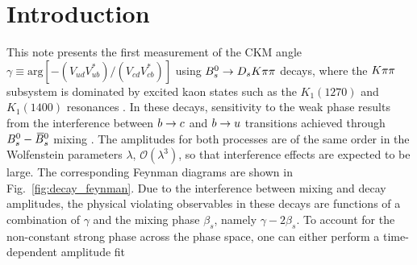 
\section{Introduction}
\label{sec:Introduction}


This note presents the first measurement of the CKM angle $\gamma \equiv \text{arg}[-(V_{ud}V_{ub}^{*})/(V_{cd}V_{cb}^{*})]$ using ${{B}^0_{s}}\rightarrow{\ensuremath{{D}_{s}}}{\ensuremath{K}}\pi\pi$ decays, 
where the ${K}{\pi}{\pi}$ subsystem is dominated by excited kaon states such as the $K_{1}(1270)$ and $K_{1}(1400)$ resonances \cite{Blusk:1471393,Blusk:2012it,LHCb-PAPER-2012-033}.
In these decays, sensitivity to the weak phase results from the
interference between ${b}\rightarrow{\ensuremath{c}}$ and ${b}\rightarrow{\ensuremath{u}}$  transitions achieved through ${{B}^0_{s}}-{{\kern 0.18em\overline{\kern -0.18em B}{}}{}^0_{s}}$ mixing \cite{Fleischer:2003yb,DeBruyn:2012jp}. 
The amplitudes for both processes are of the same order in the Wolfenstein parameters $\lambda$, $\mathcal O(\lambda^3)$, so that interference
effects are expected to be large. 
The corresponding Feynman diagrams are shown in Fig.~\ref{fig:decay_feynman}.
Due to the interference between mixing and decay amplitudes, the
physical \CP violating observables in these decays are functions of a combination of $\gamma$
and the mixing phase $\beta_s$, namely $\gamma - 2\beta_s$. 
To account for the non-constant strong phase across the phase space, 
one can either perform a time-dependent amplitude fit 
